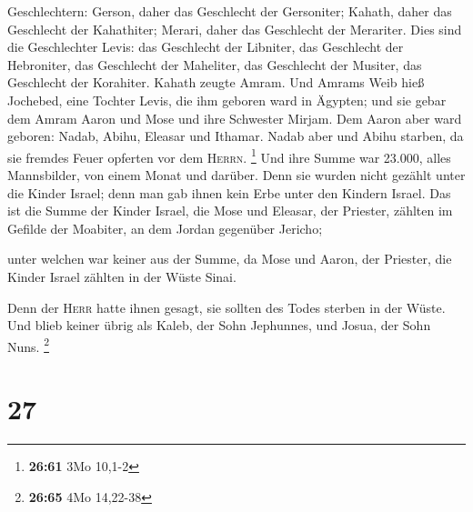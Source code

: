Geschlechtern: Gerson, daher das Geschlecht der Gersoniter; Kahath,
daher das Geschlecht der Kahathiter; Merari, daher das Geschlecht der
Merariter.  Dies sind die Geschlechter Levis: das
Geschlecht der Libniter, das Geschlecht der Hebroniter, das Geschlecht
der Maheliter, das Geschlecht der Musiter, das Geschlecht der Korahiter.
Kahath zeugte Amram.  Und Amrams Weib hieß Jochebed, eine
Tochter Levis, die ihm geboren ward in Ägypten; und sie gebar dem Amram
Aaron und Mose und ihre Schwester Mirjam.  Dem Aaron aber
ward geboren: Nadab, Abihu, Eleasar und Ithamar.  Nadab
aber und Abihu starben, da sie fremdes Feuer opferten vor dem
\textsc{Herrn}. \footnote{\textbf{26:61} 3Mo 10,1-2}  Und
ihre Summe war 23.000, alles Mannsbilder, von einem Monat und darüber.
Denn sie wurden nicht gezählt unter die Kinder Israel; denn man gab
ihnen kein Erbe unter den Kindern Israel.  Das ist die
Summe der Kinder Israel, die Mose und Eleasar, der Priester, zählten im
Gefilde der Moabiter, an dem Jordan gegenüber Jericho;

 unter welchen war keiner aus der Summe, da Mose und
Aaron, der Priester, die Kinder Israel zählten in der Wüste Sinai.

 Denn der \textsc{Herr} hatte ihnen gesagt, sie sollten
des Todes sterben in der Wüste. Und blieb keiner übrig als Kaleb, der
Sohn Jephunnes, und Josua, der Sohn Nuns. \footnote{\textbf{26:65} 4Mo
  14,22-38}

\hypertarget{section-5}{%
\section{27}\label{section-5}}

